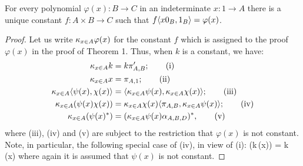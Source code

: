 \begin{theorem}
For every polynomial $\varphi(x):B \to C$ in an indeterminate $x: 1 \to A$
there is a unique constant $f: A \times B \to C$ such that $f\langle x0_B,1_B \rangle = \varphi(x)$.
\end{theorem}
\begin{proof}
Let us write $\kappa_{x \in A} \varphi(x)$ for the constant $f$ which is assigned to the proof $\varphi(x)$
in the proof of Theorem 1. Thus, when $k$ is a constant, we have:
\begin{align*}
\kappa_{x \in A} k &= k\pi'_{A,B}; \tag{i}\\
\kappa_{x \in A} x &= \pi_{A,1}; \tag{ii}\\
\kappa_{x \in A} \langle \psi(x),\chi(x) \rangle &= \langle \kappa_{x \in A}\psi(x),\kappa_{x \in A}\chi(x) \rangle; \tag{iii}\\
\kappa_{x \in A} (\psi(x) \chi(x))&= \kappa_{x \in A}\chi(x)\langle \pi_{A,B}, \kappa_{x \in A}\psi(x) \rangle;\tag{iv}\\
\kappa_{x \in A} (\psi(x)^*) &= (\kappa_{x \in A}\psi(x)\alpha_{A,B,D})^*, \tag{v}
\end{align*}
where (iii), (iv) and (v) are subject to the restriction that $\varphi(x)$ is not constant.
Note, in particular, the following special case of (iv), in view of (i):
\bes
\kxa(k\,\psi(x)) = k \,\kxa \psi(x)
\ees
where again it is assumed that $\psi(x)$ is not constant.


\end{proof}
